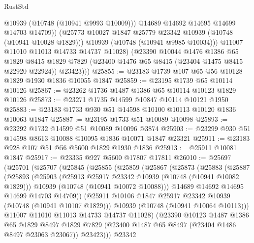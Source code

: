 \begin{lexlean}{RustStd}
\begin{coremodule}
                  @10939
                  (@10748 (@10941 @9993 @10009)))
                @14689
                @14692
                @14695
                @14699
                @14703
                @14709))
            (@25773 @10027 @1847 @25779 @23342 @10939 (@10748 (@10941 @10028 @1829)))
            @10939
            (@10748 (@10941 @9985 @10034)))
          @11007
          @11010
          @11013
          @14733
          @14737
          @11028)
        (@23390
          @10044
          @1476
          @1386
          @65
          @1829
          @8415
          @1829
          @7829
          (@23400 @1476 @65 @8415 (@23404 @1475 @8415 @22920 @22924))
          @23423)))
@25855 := @23183 @1739 @107 @65 @56 @10128 @1829 @1930 @1836 @10055 @1847
@25859 := @23195 @1739 @65 @10114 @10126
@25867 := @23262 @1736 @1487 @1386 @65 @10114 @10123 @1829 @10126
@25873 := @23271 @1735 @14599 @10847 @10114 @10121 @1950
@25883 := @23183 @1733 @930 @51 @14598 @10100 @10113 @10120 @1836 @10063 @1847
@25887 := @23195 @1733 @51 @10089 @10098
@25893 := @23292 @1732 @14599 @51 @10089 @10096 @3874
@25903 := @23299 @930 @51 @14598 @8613 @10088 @10095 @1836 @10071 @1847 @23321
@25911 := @23183 @928 @107 @51 @56 @5600 @1829 @1930 @1836
@25913 := @25911 @10081 @1847
@25917 := @23335 @927 @5600 @17807 @17811
@26010 := @25697
    (@25701
      (@25707
        (@25845
          (@25855
            (@25859
              (@25867
                (@25873
                  (@25883
                    (@25887
                      (@25893
                        (@25903
                          (@25913 @25917 @23342 @10939 (@10748 (@10941 @10082 @1829)))
                          @10939
                          (@10748 (@10941 @10072 @10088)))
                        @14689
                        @14692
                        @14695
                        @14699
                        @14703
                        @14709))
                    (@25911 @10106 @1847 @25917 @23342 @10939 (@10748 (@10941 @10107 @1829)))
                    @10939
                    (@10748 (@10941 @10064 @10113)))
                  @11007
                  @11010
                  @11013
                  @14733
                  @14737
                  @11028)
                (@23390
                  @10123
                  @1487
                  @1386
                  @65
                  @1829
                  @8497
                  @1829
                  @7829
                  (@23400 @1487 @65 @8497 (@23404 @1486 @8497 @23063 @23067))
                  @23423)))
            @23342

\end{coremodule}
\end{lexlean}
